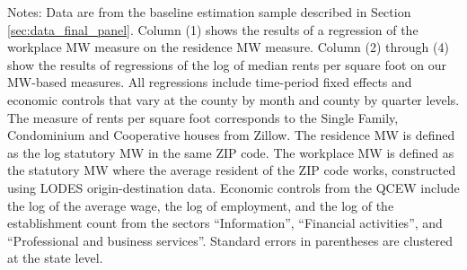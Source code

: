 \begin{table}[hbt!]
    \begin{minipage}{.95\textwidth} \footnotesize
        \vspace{2mm}
        Notes:
        Data are from the baseline estimation sample described in Section 
        \ref{sec:data_final_panel}.
        Column (1) shows the results of a regression of the workplace MW measure
        on the residence MW measure.
        Column (2) through (4) show the results of regressions of the log of 
        median rents per square foot on our MW-based measures.
        All regressions include time-period fixed effects and economic controls 
        that vary at the county by month and county by quarter levels.
        The measure of rents per square foot corresponds to the Single Family, 
        Condominium and Cooperative houses from Zillow.
        The residence MW is defined as the log statutory MW in the same ZIP code.
        The workplace MW is defined as the statutory MW where the average 
        resident of the ZIP code works, constructed using LODES 
        origin-destination data.
        Economic controls from the QCEW include the log of the average wage, 
        the log of employment, and the log of the establishment count from the 
        sectors ``Information'', ``Financial activities'', and ``Professional
        and business services''.
        Standard errors in parentheses are clustered at the state level.
    \end{minipage}
\end{table}

